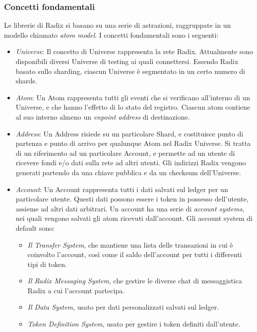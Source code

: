\subsubsection{Concetti fondamentali}

Le librerie di Radix si basano su una serie di astrazioni, raggruppate in un modello chiamato \textit{atom model}. I concetti fondamentali sono i seguenti:
\begin{itemize}
    \item \textit{Universe}: Il concetto di Universe rappresenta la rete Radix. Attualmente sono disponibili diversi Universe di testing ai quali connettersi. Essendo Radix basato sullo sharding, ciascun Universe è segmentato in un certo numero di shards.
    \item \textit{Atom}: Un Atom rappresenta tutti gli eventi che si verificano all'interno di un Universe, e che hanno l'effetto di lo stato del registro. Ciascun atom contiene al suo interno almeno un \textit{enpoint address} di destinazione.
    \item \textit{Address}: Un Address risiede su un particolare Shard, e costituisce punto di partenza e punto di arrivo per qualunque Atom nel Radix Universe. Si tratta di un riferimento ad un particolare Account, e permette ad un utente di ricevere fondi e/o dati sulla rete ad altri utenti. Gli indirizzi Radix vengono generati partendo da una chiave pubblica e da un checksum dell'Universe. 
    \item \textit{Account}: Un Account rappresenta tutti i dati salvati sul ledger per un particolare utente. Questi dati possono essere i token in possesso dell'utente, assieme ad altri dati arbitrari. Un account ha una serie di \textit{account systems}, nei quali vengono salvati gli atom ricevuti dall'account. Gli account system di default sono:
    \begin{itemize}
        \item \textit{Il Transfer System}, che mantiene una lista delle transazioni in cui è coinvolto l'account, così come il saldo dell'account per tutti i differenti tipi di token.
        \item \textit{Il Radix Messaging System}, che gestire le diverse chat di messaggistica Radix a cui l'account partecipa.
        \item \textit{Il Data System}, usato per dati personalizzati salvati sul ledger.
        \item \textit{Token Definition System}, usato per gestire i token definiti dall'utente.
    \end{itemize}

\end{itemize}
